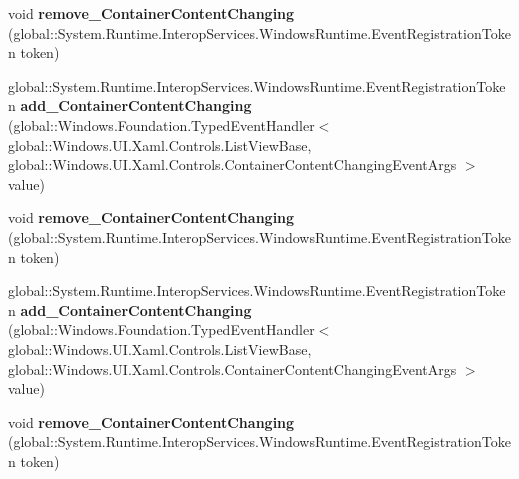 \begin{DoxyCompactItemize}
\mbox{\label{interface_windows_1_1_u_i_1_1_xaml_1_1_controls_1_1_i_list_view_base2_adfd6f212de8056b9078bc8b1c9eb39ea}} 
void {\bfseries remove\+\_\+\+Container\+Content\+Changing} (global\+::\+System.\+Runtime.\+Interop\+Services.\+Windows\+Runtime.\+Event\+Registration\+Token token)
\item 
\mbox{\label{interface_windows_1_1_u_i_1_1_xaml_1_1_controls_1_1_i_list_view_base2_a5cab1e13152724edf292ffbea21ea46e}} 
global\+::\+System.\+Runtime.\+Interop\+Services.\+Windows\+Runtime.\+Event\+Registration\+Token {\bfseries add\+\_\+\+Container\+Content\+Changing} (global\+::\+Windows.\+Foundation.\+Typed\+Event\+Handler$<$ global\+::\+Windows.\+U\+I.\+Xaml.\+Controls.\+List\+View\+Base, global\+::\+Windows.\+U\+I.\+Xaml.\+Controls.\+Container\+Content\+Changing\+Event\+Args $>$ value)
\item 
\mbox{\label{interface_windows_1_1_u_i_1_1_xaml_1_1_controls_1_1_i_list_view_base2_adfd6f212de8056b9078bc8b1c9eb39ea}} 
void {\bfseries remove\+\_\+\+Container\+Content\+Changing} (global\+::\+System.\+Runtime.\+Interop\+Services.\+Windows\+Runtime.\+Event\+Registration\+Token token)
\item 
\mbox{\label{interface_windows_1_1_u_i_1_1_xaml_1_1_controls_1_1_i_list_view_base2_a5cab1e13152724edf292ffbea21ea46e}} 
global\+::\+System.\+Runtime.\+Interop\+Services.\+Windows\+Runtime.\+Event\+Registration\+Token {\bfseries add\+\_\+\+Container\+Content\+Changing} (global\+::\+Windows.\+Foundation.\+Typed\+Event\+Handler$<$ global\+::\+Windows.\+U\+I.\+Xaml.\+Controls.\+List\+View\+Base, global\+::\+Windows.\+U\+I.\+Xaml.\+Controls.\+Container\+Content\+Changing\+Event\+Args $>$ value)
\item 
\mbox{\label{interface_windows_1_1_u_i_1_1_xaml_1_1_controls_1_1_i_list_view_base2_adfd6f212de8056b9078bc8b1c9eb39ea}} 
void {\bfseries remove\+\_\+\+Container\+Content\+Changing} (global\+::\+System.\+Runtime.\+Interop\+Services.\+Windows\+Runtime.\+Event\+Registration\+Token token)

\end{DoxyCompactItemize}
